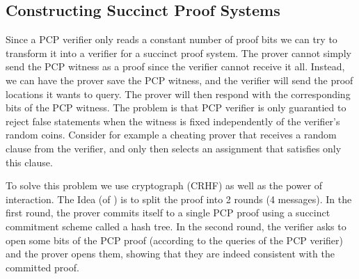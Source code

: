 \documentclass{article}
\begin{document}
\subsection{Constructing Succinct Proof Systems}
Since a PCP verifier only reads a constant number of proof bits we can try to transform it into a verifier for a succinct proof system. The prover cannot simply send the PCP witness as a proof since the verifier cannot receive it all. Instead, we can have the prover save the PCP witness, and the verifier will send the proof locations it wants to query. The prover will then respond with the corresponding bits of the PCP witness. The problem is that PCP verifier is only guarantied to reject false statements when the witness is fixed independently of the verifier's random coins. Consider for example a cheating prover that receives a random clause from the verifier, and only then selects an assignment that satisfies only this clause.

To solve this problem we use cryptograph (CRHF) as well as the power of interaction. The Idea (of \cite{Kilian92}) is to split the proof into 2 rounds (4 messages). In the first round, the prover commits itself to a single PCP proof using a succinct commitment scheme called a hash tree. In the second round, the verifier asks to open some bits of the PCP proof (according to the queries of the PCP verifier) and the prover opens them, showing that they are indeed consistent with the committed proof.
\end{document}
